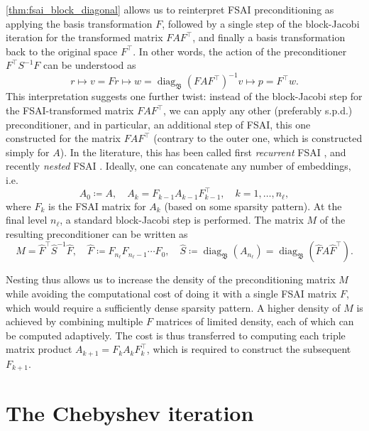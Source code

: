 \documentclass[a4paper]{article}
\DeclareMathOperator{\diag}{diag}
\theoremstyle{plain}
\theoremstyle{definition}
\theoremstyle{remark}
\begin{document}
\cref{thm:fsai_block_diagonal} allows us to reinterpret FSAI preconditioning as applying the basis transformation \(F\), followed by a single step of the block-Jacobi iteration for the transformed matrix \(F A F^{\top}\), and finally a basis transformation back to the original space \(F^{\top}\). In other words, the action of the preconditioner \(F^{\top} S^{-1} F\) can be understood as
\begin{equation*}
	r \longmapsto v = Fr \longmapsto w = \diag_{\mathfrak{B}}(F A F^{\top})^{-1} v \longmapsto p = F^{\top} w.
\end{equation*}
This interpretation suggests one further twist: instead of the block-Jacobi step for the FSAI-transformed matrix \(F A F^{\top}\), we can apply any other (preferably s.p.d.) preconditioner, and in particular, an additional step of FSAI, this one constructed for the matrix \(F A F^{\top}\) (contrary to the outer one, which is constructed simply for \(A\)). In the literature, this has been called first \emph{recurrent} FSAI \cite{Janna2015}, and recently \emph{nested} FSAI \cite{Janna2025}. Ideally, one can concatenate any number of embeddings, i.e.
\begin{equation*}
	A_0 \coloneqq A, \quad A_k = F_{k-1} A_{k-1} F_{k-1}^{\top}, \quad k = 1, \dots, n_{\ell},
\end{equation*}
where \(F_k\) is the FSAI matrix for \(A_k\) (based on some sparsity pattern). At the final level \(n_{\ell}\), a standard block-Jacobi step is performed. The matrix \(M\) of the resulting preconditioner can be written as
\begin{equation*}
	M = \hat{F}^{\top} \hat{S}^{-1} \hat{F}, \quad \hat{F} \coloneqq F_{n_{\ell}} F_{n_{\ell}-1} \cdots F_0, \quad \hat{S} \coloneqq \diag_{\mathfrak{B}}(A_{n_{\ell}}) = \diag_{\mathfrak{B}}(\hat{F} A \hat{F}^{\top}).
\end{equation*}

Nesting thus allows us to increase the density of the preconditioning matrix \(M\) while avoiding the computational cost of doing it with a single FSAI matrix \(F\), which would require a sufficiently dense sparsity pattern. A higher density of \(M\) is achieved by combining multiple \(F\) matrices of limited density, each of which can be computed adaptively. The cost is thus transferred to computing each triple matrix product \(A_{k+1} = F_k A_k F_k^{\top}\), which is required to construct the subsequent \(F_{k+1}\).



\section{The Chebyshev iteration}\label{sec:chebyshev_iteration}
\end{document}

